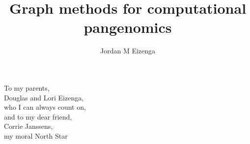 \documentclass[11pt]{ucthesis}
\begin{document}

\title{Graph methods for computational pangenomics}
\author{Jordan M Eizenga}
\deanlinethree{}

\begin{frontmatter}

\maketitle
\copyrightpage

\tableofcontents
\listoffigures
\listoftables

\begin{abstract}


\end{abstract}

\begin{dedication}
\null\vfil
{\large
\begin{center}
To my parents,\\%
Douglas and Lori Eizenga,\\%
who I can always count on, \\\vspace{48pt}
and to my dear friend, \\%
Corrie Janssens,\\%
my moral North Star
\end{center}}
\vfil\null
\end{dedication}


\begin{acknowledgements}

\end{acknowledgements}

\end{frontmatter}
\end{document}
